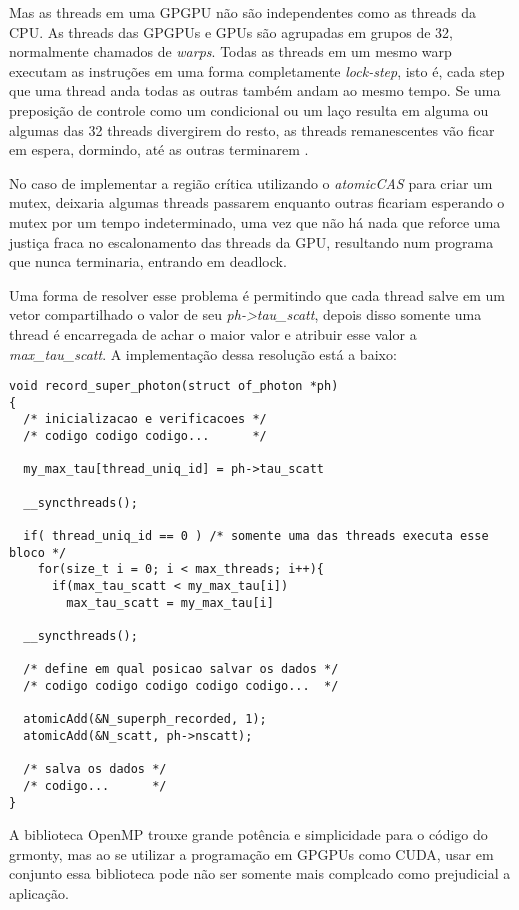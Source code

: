     Mas as threads em uma GPGPU não são independentes como as threads da CPU. As threads das GPGPUs e GPUs são agrupadas em grupos de 32, normalmente chamados de \textit{warps}. Todas as threads em um mesmo warp executam as instruções em uma forma completamente \textit{lock-step}, isto é, cada step que uma thread anda todas as outras também andam ao mesmo tempo. Se uma preposição de controle como um condicional ou um laço resulta em alguma ou algumas das 32 threads divergirem do resto, as threads remanescentes vão ficar em espera, dormindo, até as outras terminarem \citep{bestparccuda}.

    No caso de implementar a região crítica utilizando o \textit{atomicCAS} para criar um mutex, deixaria algumas threads passarem enquanto outras ficariam esperando o mutex por um tempo indeterminado, uma vez que não há nada que reforce uma justiça fraca no escalonamento das threads da GPU, resultando num programa que nunca terminaria, entrando em deadlock.

    Uma forma de resolver esse problema é permitindo que cada thread salve em um vetor compartilhado o valor de seu \textit{ph->tau\_scatt}, depois disso somente uma thread é encarregada de achar o maior valor e atribuir esse valor a \textit{max\_tau\_scatt}. A implementação dessa resolução está a baixo:

    \begin{lstlisting}
void record_super_photon(struct of_photon *ph)
{
  /* inicializacao e verificacoes */
  /* codigo codigo codigo...      */

  my_max_tau[thread_uniq_id] = ph->tau_scatt

  __syncthreads();

  if( thread_uniq_id == 0 ) /* somente uma das threads executa esse bloco */
    for(size_t i = 0; i < max_threads; i++){
      if(max_tau_scatt < my_max_tau[i])
        max_tau_scatt = my_max_tau[i]

  __syncthreads();

  /* define em qual posicao salvar os dados */
  /* codigo codigo codigo codigo codigo...  */

  atomicAdd(&N_superph_recorded, 1);
  atomicAdd(&N_scatt, ph->nscatt);

  /* salva os dados */
  /* codigo...      */
}
    \end{lstlisting}

    A biblioteca OpenMP trouxe grande potência e simplicidade para o código do grmonty, mas ao se utilizar a programação em GPGPUs como CUDA, usar em conjunto essa biblioteca pode não ser somente mais complcado como prejudicial a aplicação.

